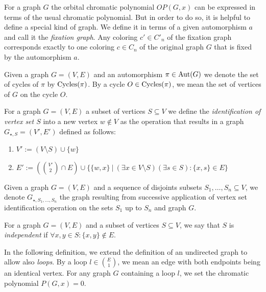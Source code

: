 For a graph $G$ the orbital chromatic polynomial $OP(G,x)$ can be expressed in terms of the usual chromatic polynomial. But in order to do so, it is helpful to define a special kind of graph. We define it in terms of a given automorphism $a$ and call it the \textit{fixation graph}. Any coloring $c' \in C'_n$ of the fixation graph corresponds exactly to one coloring $c \in C_n$ of the original graph $G$ that is fixed by the automorphism $a$.

\begin{defn}
    Given a graph $G=(V,E)$ and an automorphism $\pi \in \operatorname{Aut}(G)$ we denote the set of cycles of $\pi$ by $\operatorname{Cycles}(\pi)$. By a cycle $O \in \operatorname{Cycles}(\pi)$, we mean the set of vertices of $G$ on the cycle $O$.
\end{defn}

\begin{defn}
    For a graph $G=(V,E)$ a subset of vertices $S \subseteq V$ we define the \emph{identification of vertex set $S$} into a new vertex $w \notin V$ as the operation that results in a graph $G_{\star,S}=(V',E')$ defined as follows:
    \begin{enumerate}
        \item $V' := (V \setminus S) \cup \{w\}$
        \item $E' := \left( \binom{V'}{2} \cap E\right) \cup \{ \{w,x\} \ | \ (\exists x \in V \setminus S)(\exists s \in S): \{x,s\} \in E\}$
    \end{enumerate}
\end{defn}

Given a graph $G=(V,E)$ and a sequence of disjoints subsets $S_1, \ldots , S_n \subseteq V$, we denote $G_{\star,S_1,\ldots,S_n}$ the graph resulting from successive application of vertex set identification operation on the sets $S_1$ up to $S_n$ and graph $G$.

\begin{defn}
    For a graph $G=(V,E)$ and a subset of vertices $S \subseteq V$, we say that $S$ is \emph{independent} if $\forall x,y \in S : \{x,y\} \notin E$.
\end{defn}

In the following definition, we extend the definition of an undirected graph to allow also \textit{loops}. By a loop $l \in \binom{E}{1}$, we mean an edge with both endpoints being an identical vertex. For any graph $G$ containing a loop $l$, we set the chromatic polynomial $P(G,x) = 0$.

